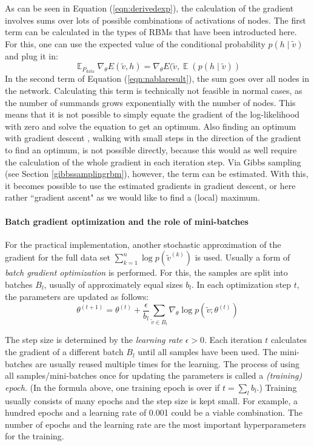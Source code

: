 \documentclass[12pt]{article}
\DeclareMathOperator{\EX}{\mathbb{E}}
\begin{document}
As can be seen in Equation (\ref{eqn:derivedexp}), the calculation of the gradient involves sums over lots of possible combinations of activations of nodes.
The first term can be calculated in the types of RBMs that have been introducted here.
For this, one can use the expected value of the conditional probability $p(h\mid\tilde{v})$ and plug it in:
\begin{equation}
\EX_{P_\text{data}} \nabla_{\!\theta} E(\tilde{v},h) =  \nabla_{\!\theta} E(\tilde{v}, \EX(p(h \mid \tilde{v}))
\label{eqn:plugexpectedh}
\end{equation}
In the second term of Equation (\ref{eqn:nablaresult}), the sum goes over all nodes in the network.
Calculating this term is technically not feasible in normal cases, as the number of summands grows exponentially with the number of nodes.
This means that it is not possible to simply equate the gradient of the log-likelihood with zero and solve the equation to get an optimum. Also finding an optimum with gradient descent \citep{gradientdescent}, walking with small steps in the direction of the gradient to find an optimum, is not possible directly, because this would as well require the calculation of the whole gradient in each iteration step.
Via Gibbs sampling (see Section \ref{gibbssamplingrbm}), however, the term can be estimated.
With this, it becomes possible to use the estimated gradients in gradient descent, or here rather ``gradient ascent" as we would like to find a (local) maximum.

\paragraph{Batch gradient optimization and the role of mini-batches}

For the practical implementation, another stochastic approximation of the gradient for the full data set $\sum_{k=1}^n \log p(\tilde{v}^{(k)})$ is used.
Usually a form of {\em batch gradient optimization} \citep{bottou_optimization_2018} is performed.
For this, the samples are split into batches $B_l$, usually of approximately equal sizes $b_l$.
In each optimization step $t$, the parameters are updated as follows:
\[
\theta^{(t+1)} = \theta^{(t)} + \frac{\epsilon}{b_l} \sum_{\tilde{v} \in B_l} \nabla_{\!\theta} \log p ( \tilde{v}; \theta^{(t)}) 
\]

The step size is determined by the {\em learning rate} $\epsilon > 0$.
Each iteration $t$ calculates the gradient of a different batch $B_l$ until all samples have been used.
The mini-batches are usually reused multiple times for the learning.
The process of using all samples/mini-batches once for updating the parameters is called a {\em (training) epoch}.
(In the formula above, one training epoch is over if $t = \sum_l b_l$.)
Training usually consists of many epochs and the step size is kept small.
For example, a hundred epochs and a learning rate of 0.001 could be a viable combination.
The number of epochs and the learning rate are the most important hyperparameters for the training.
\end{document}
